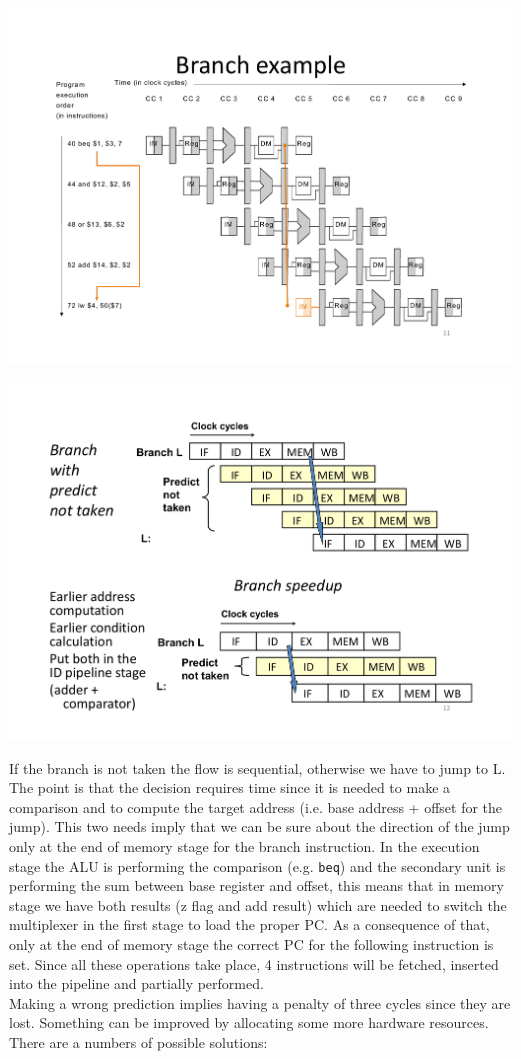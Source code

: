 \begin{center}
  \includegraphics[width=0.9\linewidth]{img/img3/mips8}
\end{center}
\begin{center}
  \includegraphics[width=0.9\linewidth]{img/img3/mips9}
\end{center}

If the branch is not taken the flow is sequential, otherwise we have to jump to L. The point is that the decision requires time since it is needed to make a comparison and to compute the target address (i.e. base address + offset for the jump). This two needs imply that we can be sure about the direction of the jump only at the end of memory stage for the branch instruction. In the execution stage the ALU is performing the comparison (e.g. \verb|beq|) and the secondary unit is performing the sum between base register and offset, this means that in memory stage we have both results (z flag and add result) which are needed to switch the multiplexer in the first stage to load the proper PC. As a consequence of that, only at the end of memory stage the correct PC for the following instruction is set. Since all these operations take place, 4 instructions will be fetched, inserted into the pipeline and partially performed.\\
Making a wrong prediction implies having a penalty of three cycles since they are lost. Something can be improved by allocating some more hardware resources. There are a numbers of possible solutions:


